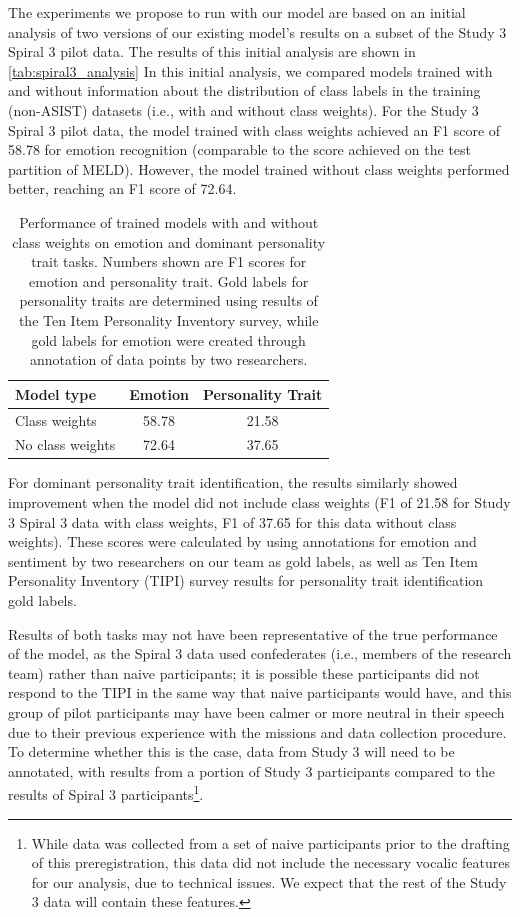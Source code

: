 \documentclass[11pt]{article}
\begin{document}
The experiments we propose to run with our model are based on an initial
analysis of two versions of our existing model's results on a subset of the
Study 3 Spiral 3 pilot data. The results of this initial analysis are shown in
\autoref{tab:spiral3_analysis} In this initial analysis, we compared models
trained with and without information about the distribution of class labels in
the training (non-ASIST) datasets (i.e., with and without class weights).  For
the Study 3 Spiral 3 pilot data, the model trained with class weights achieved
an F1 score of 58.78 for emotion recognition (comparable to the score achieved
on the test partition of MELD). However, the model trained without class
weights performed better, reaching an F1 score of 72.64.

\begin{table}
    \small
    \centering
    \begin{tabular}{lcc}
        \hline
        Model type & Emotion & Personality Trait \\
        \hline
        Class weights & 58.78 & 21.58 \\
        No class weights & 72.64 & 37.65 \\
        \hline
    \end{tabular}
    \caption{%
        Performance of trained models with and without class weights on
        emotion and dominant personality trait tasks. Numbers shown are F1 scores
        for emotion and personality trait. Gold labels for personality traits are
        determined using results of the Ten Item Personality Inventory survey,
        while gold labels for emotion were created through annotation of data
        points by two researchers.
    }
    \label{tab:spiral3_analysis}
\end{table}

For dominant personality trait identification, the results similarly showed
improvement when the model did not include class weights (F1 of 21.58 for Study
3 Spiral 3 data with class weights, F1 of 37.65 for this data without class
weights). These scores were calculated by using annotations for emotion and
sentiment by two researchers on our team as gold labels, as well as Ten Item
Personality Inventory (TIPI) survey results for personality trait
identification gold labels.

Results of both tasks may not have been representative of the true performance
of the model, as the Spiral 3 data used confederates (i.e., members of the
research team) rather than naive participants; it is possible these
participants did not respond to the TIPI in the same way that naive
participants would have, and this group of pilot participants may have been
calmer or more neutral in their speech due to their previous experience with
the missions and data collection procedure. To determine whether this is the
case, data from Study 3 will need to be annotated, with results from a portion
of Study 3 participants compared to the results of Spiral 3
participants\footnote{While data was collected from a set of naive participants
prior to the drafting of this preregistration, this data did not include the
necessary vocalic features for our analysis, due to technical issues. We expect
that the rest of the Study 3 data will contain these features.}.
\end{document}
